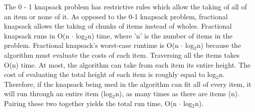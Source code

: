 \documentclass[letterpaper, 10pt]{article}
\begin{document}
The 0 - 1 knapsack problem has restrictive rules which allow the taking of all of an item or none of it. As opposed to the 0-1 knapsack problem, fractional knapsack allows the taking of chunks of items instead of wholes. Fractional knapsack runs in O(n $\cdot$ log$_{2}$n) time, where 'n' is the number of items in the problem. Fractional knapsack's worst-case runtime is O(n $\cdot$ log$_{2}$n) because the algorithm must evaluate the costs of each item. Traversing all the items takes O(n) time. At most, the algorithm can take from each item its entire height. The cost of evaluating the total height of each item is roughly equal to log$_{2}$n. Therefore, if the knapsack being used in the algorithm can fit all of every item, it will run through an entire item (log$_{2}$n), as many times as there are items (n). Pairing these two together yields the total run time, O(n $\cdot$ log$_{2}$n). \par
\end{document}
